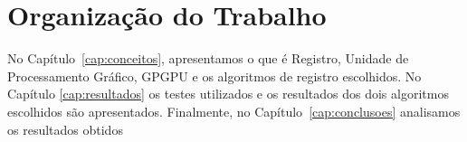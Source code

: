 \section{Organização do Trabalho}
\label{sec:organizacao_trabalho}

No Capítulo~\ref{cap:conceitos}, apresentamos o que é Registro, Unidade de Processamento Gráfico, GPGPU e os algoritmos 
de registro escolhidos. No Capítulo \ref{cap:resultados} os testes utilizados e os resultados dos dois algoritmos 
escolhidos são apresentados. Finalmente, no Capítulo~\ref{cap:conclusoes} analisamos os resultados obtidos 